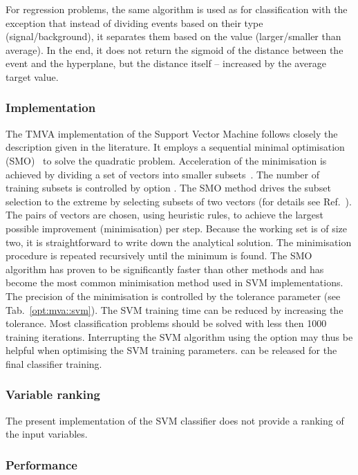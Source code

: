 For regression problems, the same algorithm is used as for classification with the exception that instead of dividing 
events based on their type (signal/background), it separates them based on the value
(larger/smaller than average). In the end, it does not return the sigmoid of the distance 
between the event and the hyperplane, but the distance itself -- increased by the average target value. 

\subsubsection*{Implementation}

The TMVA implementation of the Support Vector Machine follows closely the description  
given in the literature. It employs a sequential minimal optimisation (SMO)~\cite{Platt}  
to solve the quadratic problem. Acceleration of the minimisation is achieved by dividing
a set of vectors into smaller subsets~\cite{Keerthi}. The number of training subsets is 
controlled by option . The SMO method drives the subset 
selection to the extreme by selecting subsets of two vectors (for details see 
Ref.~\cite{Burges}). The pairs of vectors are chosen, using heuristic rules, to achieve
the largest possible improvement (minimisation) per step. Because the working set is of 
size two, it is straightforward to write down the analytical solution. The minimisation 
procedure is repeated recursively until the minimum is found. The SMO algorithm has proven 
to be significantly faster than other methods and has become the most common  
minimisation method used in SVM implementations. The precision of the minimisation 
is controlled by the tolerance parameter  (see Tab.~\ref{opt:mva::svm}). The 
SVM training time can be reduced by increasing the tolerance. Most classification problems 
should be solved with less then 1000 training iterations. Interrupting the SVM algorithm 
using the option  may thus be helpful when optimising the SVM training 
parameters.   can be released for the final classifier training.

\subsubsection{Variable ranking}

The present implementation of the SVM classifier does not provide a ranking 
of the input variables.

\subsubsection{Performance}
\label{SVM:performance}

